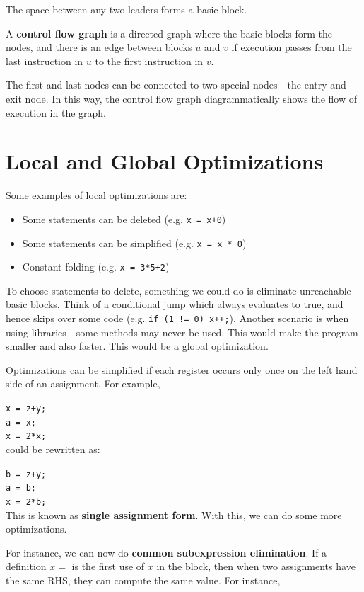 \documentclass[12pt,letterpaper]{book}
\theoremstyle{definition}
\begin{document}
The space between any two leaders forms a basic block.

A \textbf{control flow graph}  is a directed graph where the basic blocks form the nodes, and there is an edge between blocks $u$ and $v$ if execution passes from the last instruction in $u$ to the first instruction in $v$.

The first and last nodes can be connected to two special nodes - the entry and exit node. In this way, the control flow graph diagrammatically shows the flow of execution in the graph.

\section{Local and Global Optimizations}

Some examples of local optimizations are:
\begin{itemize}
  \item Some statements can be deleted (e.g. \texttt{x = x+0})
  \item Some statements can be simplified (e.g. \texttt{x = x * 0})
  \item Constant folding (e.g. \texttt{x = 3*5+2})
\end{itemize}

To choose statements to delete, something we could do is eliminate unreachable basic blocks. Think of a conditional jump which always evaluates to true, and hence skips over some code (e.g. \texttt{if (1 != 0) x++;}). Another scenario is when using libraries - some methods may never be used. This would make the program smaller and also faster. This would be a global optimization.

Optimizations can be simplified if each register occurs only once on the left hand side of an assignment. For example,

\texttt{x = z+y;} \\
\texttt{a = x;} \\
\texttt{x = 2*x;} \\
could be rewritten as:

\texttt{b = z+y;}\\
\texttt{a = b;}\\
\texttt{x = 2*b;}\\
This is known as \textbf{single assignment form}. With this, we can do some more optimizations.

For instance, we can now do \textbf{common subexpression elimination}. If a definition $x = $ is the first use of $x$ in the block, then when two assignments have the same RHS, they can compute the same value. For instance,
\end{document}

